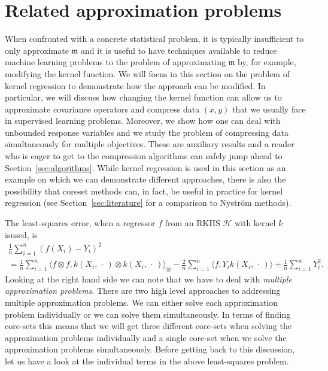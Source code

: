 \documentclass[AHL,Unicode,longabstracts,published]{cedram}
\theoremstyle{remark}
\newcommand{\cH}{\mathcal{H}}
\newcommand{\mean}{\mathfrak{m}}
\begin{document}
\section{Related approximation problems} \label{sec:related_approx}
When confronted with a concrete statistical problem, it is typically insufficient to only approximate $\mean$ and it is useful to have techniques available to reduce machine learning problems to the problem of approximating $\mean$ by, for example, modifying the kernel function. We will focus in this section on the problem of kernel regression to demonstrate how the approach can be modified. In particular, we will discuss how changing the kernel function can allow us to approximate covariance operators and compress data $(x,y)$ that we usually face in supervised learning problems. Moreover, we show how one can deal with unbounded response variables and we study the problem of compressing data simultaneously for multiple objectives. These are auxiliary results and a reader who is eager to get to the compression algorithms can safely jump ahead to Section~\ref{sec:algorithms}. While kernel regression is used in this section as an example on which we can demonstrate different approaches, there is also the possibility that coreset methods can, in fact, be useful in practice for kernel regression (see Section~\ref{sec:literature} for a comparison to Nystr\"om methods).

The least-squares error, when a regressor $f$ from an RKHS $\cH$ with kernel $k$ is\linebreak used, is
\begin{multline*}
\frac{1}{n} \sum_{i=1}^n (f(X_i) - Y_i)^2 \\
= \frac{1}{n} \sum_{i=1}^n \bigl\langle f \otimes f, k(X_i,\,\cdot\,) \otimes k(X_i,\,\cdot\,) \bigr\rangle_{\otimes} - \frac{2}{n} \sum_{i=1}^n \langle f, Y_i k(X_i,\,\cdot\,) \rangle + \frac{1}{n} \sum_{i=1}^n Y_i^2.
\end{multline*}
Looking at the right hand side we can note that we have to deal with \emph{multiple approximation problems}. There are two high level approaches to addressing multiple approximation problems. We can either solve each approximation problem individually or we can solve them simultaneously. In terms of finding core-sets this means that we will get three different core-sets when solving the approximation problems individually and a single core-set when we solve the approximation problems simultaneously. Before getting back to this discussion, let us have a look at the individual terms in the above least-squares problem.
\end{document}
